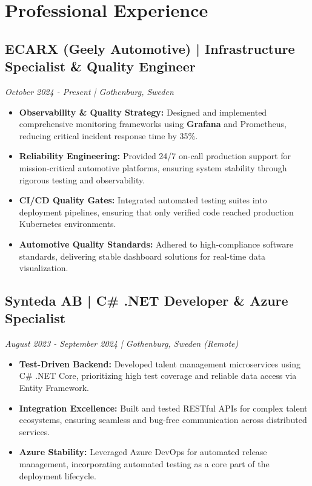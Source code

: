 \documentclass[11pt,a4paper]{article}
\begin{document}
\section*{Professional Experience}

\subsection*{ECARX (Geely Automotive) | Infrastructure Specialist \& Quality Engineer}
\textit{October 2024 - Present | Gothenburg, Sweden}
\begin{itemize}[noitemsep]
\item \textbf{Observability \& Quality Strategy:} Designed and implemented comprehensive monitoring frameworks using \textbf{Grafana} and Prometheus, reducing critical incident response time by 35\%.
\item \textbf{Reliability Engineering:} Provided 24/7 on-call production support for mission-critical automotive platforms, ensuring system stability through rigorous testing and observability.
\item \textbf{CI/CD Quality Gates:} Integrated automated testing suites into deployment pipelines, ensuring that only verified code reached production Kubernetes environments.
\item \textbf{Automotive Quality Standards:} Adhered to high-compliance software standards, delivering stable dashboard solutions for real-time data visualization.
\end{itemize}

\subsection*{Synteda AB | C\# .NET Developer \& Azure Specialist}
\textit{August 2023 - September 2024 | Gothenburg, Sweden (Remote)}
\begin{itemize}[noitemsep]
\item \textbf{Test-Driven Backend:} Developed talent management microservices using C\# .NET Core, prioritizing high test coverage and reliable data access via Entity Framework.
\item \textbf{Integration Excellence:} Built and tested RESTful APIs for complex talent ecosystems, ensuring seamless and bug-free communication across distributed services.
\item \textbf{Azure Stability:} Leveraged Azure DevOps for automated release management, incorporating automated testing as a core part of the deployment lifecycle.
\end{itemize}
\end{document}
